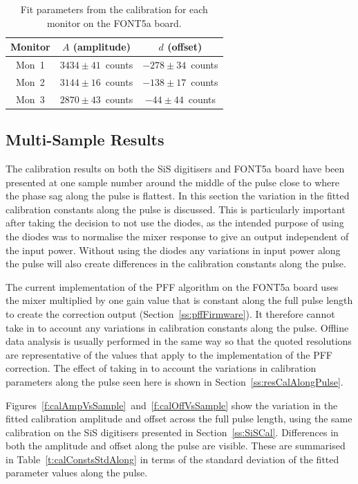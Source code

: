 \begin{table}
  \begin{center}
    \begin{tabular}{|c c c|}
	   \hline
       Monitor & \(A\) (amplitude) & \(d\) (offset) \\ \hline
       Mon~1 & \(3434\pm41\)~counts & \(-278\pm34\)~counts \\ 
       Mon~2 & \(3144\pm16\)~counts & \(-138\pm17\)~counts\\
       Mon~3 & \(2870\pm43\)~counts & \(-44\pm44\)~counts\\ \hline
    \end{tabular}
    \caption{Fit parameters from the calibration for each monitor on the FONT5a board.}
  	\label{t:calFONTConsts}
  \end{center}
\end{table}

\subsection{Multi-Sample Results}
\label{ss:calMultiSamp}

The calibration results on both the SiS digitisers and FONT5a board have been presented at one sample number around the middle of the pulse close to where the phase sag along the pulse is flattest. In this section the variation in the fitted calibration constants along the pulse is discussed. This is particularly important after taking the decision to not use the diodes, as the intended purpose of using the diodes was to normalise the mixer response to give an output independent of the input power. Without using the diodes any variations in input power along the pulse will also create differences in the calibration constants along the pulse. 

The current implementation of the PFF algorithm on the FONT5a board uses the mixer multiplied by one gain value that is constant along the full pulse length to create the correction output (Section~\ref{ss:pffFirmware}). It therefore cannot take in to account any variations in calibration constants along the pulse. Offline data analysis is usually performed in the same way so that the quoted resolutions are representative of the values that apply to the implementation of the PFF correction. The effect of taking in to account the variations in calibration parameters along the pulse seen here is shown in Section~\ref{ss:resCalAlongPulse}.

Figures~\ref{f:calAmpVsSample}~and~\ref{f:calOffVsSample} show the variation in the fitted calibration amplitude and offset across the full pulse length, using the same calibration on the SiS digitisers presented in Section~\ref{ss:SiSCal}. Differences in both the amplitude and offset along the pulse are visible. These are summarised in Table~\ref{t:calConstsStdAlong} in terms of the standard deviation of the fitted parameter values along the pulse. 


